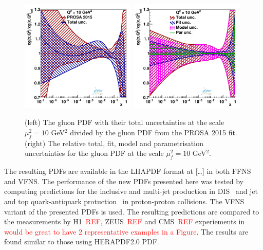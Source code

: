 \documentclass[12pt]{article}
\begin{document}
\begin{figure}
    \centering
    \includegraphics[width=0.49\textwidth]{figs/q2_10_pdf_g_ratio.pdf}
    \includegraphics[width=0.49\textwidth]{figs/gluonunc.pdf}
    \caption{(left) The gluon PDF with their total uncertainties at the scale $\mu^2_f=10$ GeV$^2$ divided by the gluon PDF from the PROSA 2015 fit. (right) The relative total, fit, model and parametrisation uncertainties for the gluon PDF at the scale $\mu^2_f=10$ GeV$^2$.}
    \label{fig:pdfratios}
\end{figure}

The resulting PDFs are available in the LHAPDF format at [\dots] in both FFNS and VFNS.
The performance of the new PDFs presented here was tested by computing predictions for the inclusive and multi-jet production in DIS~\cite{Chekanov:2002be,Chekanov:2006xr,Abramowicz:2010cka,Aktas:2007aa,Aaron:2010ac} and jet~\cite{Chatrchyan:2012bja} and top quark-antiquark protuction~\cite{Sirunyan:2017azo,Sirunyan:2019zvx} in proton-proton collisions. The VFNS variant of the presented PDFs is used. The resulting predictions are compared to the measurements by H1~\textcolor{red}{REF}, ZEUS~\textcolor{red}{REF} and CMS~\textcolor{red}{REF} experiements in \textcolor{red}{would be great to have 2 representative examples in a Figure}. The results are found similar to those using HERAPDF2.0 PDF.
\end{document}
